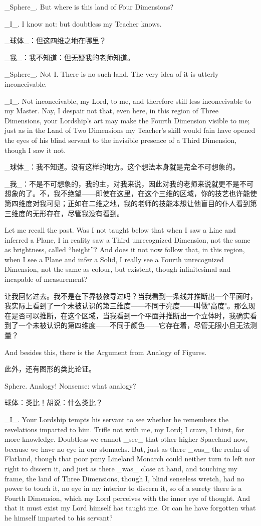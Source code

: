 \documentclass[12pt,UTF8]{ctexbook}
\begin{document}
\_Sphere\_. But where is this land of Four Dimensions?

\_I\_. I know not: but doubtless my Teacher knows.

\_球体\_：但这四维之地在哪里？

\_我\_：我不知道：但无疑我的老师知道。

\_Sphere\_. Not I. There is no such land. The very idea of it is utterly inconceivable.

\_I\_. Not inconceivable, my Lord, to me, and therefore still less inconceivable to my Master. Nay, I despair not that, even here, in this region of Three Dimensions, your Lordship's art may make the Fourth Dimension visible to me; just as in the Land of Two Dimensions my Teacher's skill would fain have opened the eyes of his blind servant to the invisible presence of a Third Dimension, though I saw it not.

\_球体\_：我不知道。没有这样的地方。这个想法本身就是完全不可想象的。

\_我\_：不是不可想象的，我的主，对我来说，因此对我的老师来说就更不是不可想象的了。不，我不绝望——即使在这里，在这个三维的区域，你的技艺也许能使第四维度对我可见；正如在二维之地，我的老师的技能本想让他盲目的仆人看到第三维度的无形存在，尽管我没有看到。

Let me recall the past. Was I not taught below that when I saw a Line and inferred a Plane, I in reality saw a Third unrecognized Dimension, not the same as brightness, called ``height''? And does it not now follow that, in this region, when I see a Plane and infer a Solid, I really see a Fourth unrecognized Dimension, not the same as colour, but existent, though infinitesimal and incapable of measurement?

让我回忆过去。我不是在下界被教导过吗？当我看到一条线并推断出一个平面时，我实际上看到了一个未被认识的第三维度——不同于亮度——叫做"高度"。那么现在是否可以推断，在这个区域，当我看到一个平面并推断出一个立体时，我确实看到了一个未被认识的第四维度——不同于颜色——它存在着，尽管无限小且无法测量？

And besides this, there is the Argument from Analogy of Figures.

此外，还有图形的类比论证。

Sphere. Analogy! Nonsense: what analogy?

球体：类比！胡说：什么类比？

\_I\_. Your Lordship tempts his servant to see whether he remembers the revelations imparted to him. Trifle not with me, my Lord; I crave, I thirst, for more knowledge. Doubtless we cannot \_see\_ that other higher Spaceland now, because we have no eye in our stomachs. But, just as there \_was\_ the realm of Flatland, though that poor puny Lineland Monarch could neither turn to left nor right to discern it, and just as there \_was\_ close at hand, and touching my frame, the land of Three Dimensions, though I, blind senseless wretch, had no power to touch it, no eye in my interior to discern it, so of a surety there is a Fourth Dimension, which my Lord perceives with the inner eye of thought. And that it must exist my Lord himself has taught me. Or can he have forgotten what he himself imparted to his servant?
\end{document}
